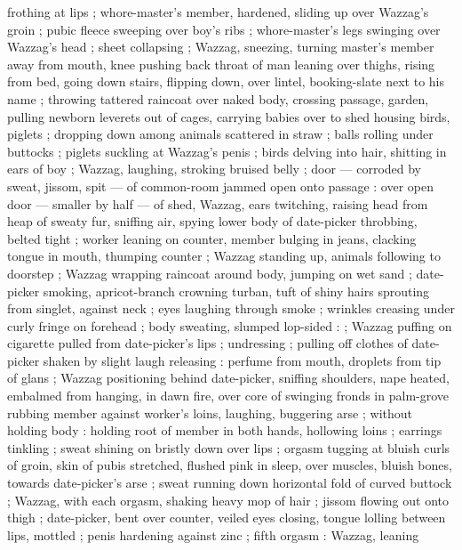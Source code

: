 frothing at lips ; whore-master's member, hardened, sliding up over Wazzag's groin ; pubic fleece
sweeping over boy's ribs ; whore-master's legs swinging over Wazzag's head ; sheet collapsing ;
Wazzag, sneezing, turning master's member away from mouth, knee pushing back throat of man leaning
over thighs, rising from bed, going down stairs, flipping down, over lintel, booking-slate next to
his name ; throwing tattered raincoat over naked body, crossing passage, garden, pulling newborn
leverets out of cages, carrying babies over to shed housing birds, piglets ; dropping down among
animals scattered in straw ; balls rolling under buttocks ; piglets suckling at Wazzag's penis ;
birds delving into hair, shitting in ears of boy ; Wazzag, laughing, stroking bruised belly ; door
--- corroded by sweat, jissom, spit --- of common-room jammed open onto passage : over open door ---
smaller by half --- of shed, Wazzag, ears twitching, raising head from heap of sweaty fur, sniffing
air, spying lower body of date-picker throbbing, belted tight ; worker leaning on counter, member
bulging in jeans, clacking tongue in mouth, thumping counter ; Wazzag standing up, animals following
to doorstep ; Wazzag wrapping raincoat around body, jumping on wet sand ; date-picker smoking,
apricot-branch crowning turban, tuft of shiny hairs sprouting from singlet, against neck ; eyes
laughing through smoke ; wrinkles creasing under curly fringe on forehead ; body sweating, slumped %
lop-sided : {\thd} ; Wazzag puffing on cigarette pulled from
date-picker's lips ; undressing ; pulling off clothes of date-picker shaken by slight laugh
releasing : perfume from mouth, droplets from tip of glans ; Wazzag positioning behind date-picker,
sniffing shoulders, nape{\comdash} heated, embalmed from hanging, in dawn fire, over core of
swinging fronds in palm-grove {\dashcom} rubbing member against worker's loins, laughing, buggering
arse ; without holding body : holding root of member in both hands, hollowing loins ; earrings
tinkling ; sweat shining on bristly down over lips ; orgasm tugging at bluish curls of groin, skin
of pubis stretched, flushed pink in sleep, over muscles, bluish bones, towards date-picker's arse ;
sweat running down horizontal fold of curved buttock ; Wazzag, with each orgasm, shaking heavy mop
of hair ; jissom flowing out onto thigh ; date-picker, bent over counter, veiled eyes closing,
tongue lolling between lips, mottled ; penis hardening against zinc ; fifth orgasm : Wazzag, leaning
